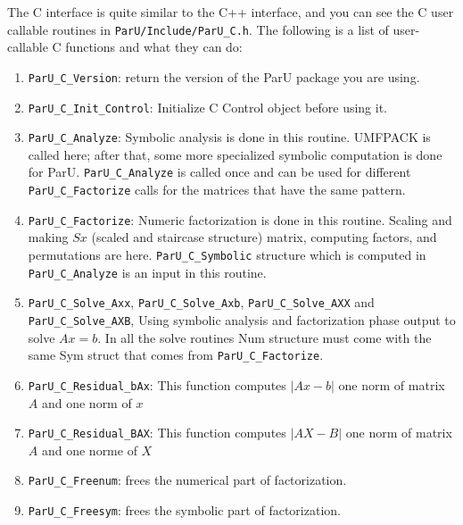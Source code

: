 \documentclass[12pt]{article}
\begin{document}
The C interface is quite similar to the C++ interface, and you can see the C user 
callable routines in 
\verb'ParU/Include/ParU_C.h'.
The following is a list of user-callable C functions and what they
can do:

\begin{enumerate}

    \item \verb'ParU_C_Version': return the version of the ParU package 
        you are using.

    \item \verb'ParU_C_Init_Control': Initialize C Control object before using 
        it.

    \item \verb'ParU_C_Analyze': Symbolic analysis is done in this routine. 
        UMFPACK is called here; after that, some more specialized symbolic
        computation is done for ParU. 
        \verb'ParU_C_Analyze' is called once and can be used for different 
        \verb'ParU_C_Factorize' calls for the matrices that have the same pattern.
    \item \verb'ParU_C_Factorize': 
        Numeric factorization is done in this routine. Scaling and
        making $Sx$ (scaled and staircase structure) matrix, computing factors,  
        and permutations are here. \verb'ParU_C_Symbolic' structure which is 
        computed in \verb'ParU_C_Analyze' is an input in this routine.

    \item \verb'ParU_C_Solve_Axx',  \verb'ParU_C_Solve_Axb', 
        \verb'ParU_C_Solve_AXX' and \verb'ParU_C_Solve_AXB',  
        Using symbolic analysis and factorization phase output to solve $Ax=b$.
        In all the solve routines Num structure must come with the same 
        Sym struct that comes from \verb'ParU_C_Factorize'. 

    \item \verb'ParU_C_Residual_bAx':  
        This function computes $|Ax-b|$ one norm of matrix $A$ and one norm of
        $x$ 

    \item \verb'ParU_C_Residual_BAX':  
        This function computes $|AX-B|$ one norm of matrix $A$ and one norme of
        $X$


    \item \verb'ParU_C_Freenum':  frees the numerical part of factorization.


    \item \verb'ParU_C_Freesym':  frees the symbolic part of factorization.

\end{enumerate}
\end{document}
